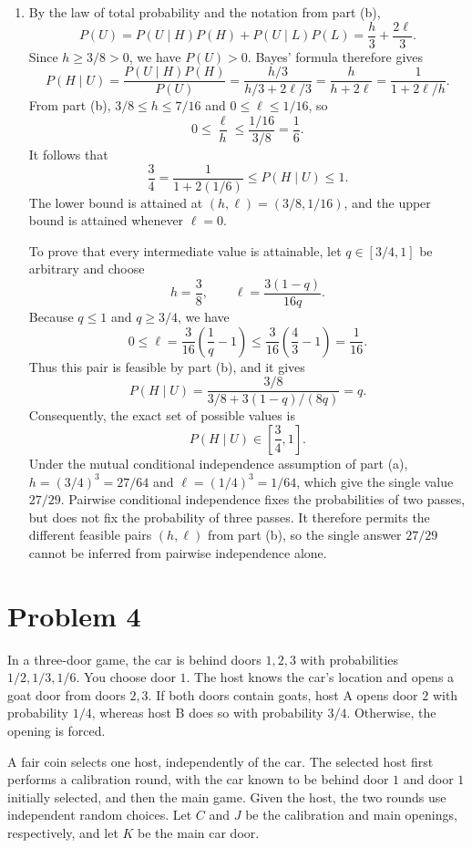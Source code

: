 \documentclass[11pt,a4paper]{article}
\newcommand{\Prob}{P}
\begin{document}
\begin{enumerate}
\item By the law of total probability and the notation from part (b),
\[
\Prob(U)=\Prob(U\mid H)\Prob(H)+\Prob(U\mid L)\Prob(L)
=\frac{h}{3}+\frac{2\ell}{3}.
\]
Since $h\ge3/8>0$, we have $\Prob(U)>0$. Bayes' formula therefore gives
\[
\Prob(H\mid U)
=\frac{\Prob(U\mid H)\Prob(H)}{\Prob(U)}
=\frac{h/3}{h/3+2\ell/3}
=\frac{h}{h+2\ell}
=\frac{1}{1+2\ell/h}.
\]
From part (b), $3/8\le h\le7/16$ and $0\le\ell\le1/16$, so
\[
0\le\frac{\ell}{h}\le\frac{1/16}{3/8}=\frac16.
\]
It follows that
\[
\frac34=\frac{1}{1+2(1/6)}
\le\Prob(H\mid U)\le1.
\]
The lower bound is attained at $(h,\ell)=(3/8,1/16)$, and the upper
bound is attained whenever $\ell=0$.

To prove that every intermediate value is attainable, let
$q\in[3/4,1]$ be arbitrary and choose
\[
h=\frac38,\qquad \ell=\frac{3(1-q)}{16q}.
\]
Because $q\le1$ and $q\ge3/4$, we have
\[
0\le\ell=\frac3{16}\left(\frac1q-1\right)
\le\frac3{16}\left(\frac43-1\right)=\frac1{16}.
\]
Thus this pair is feasible by part (b), and it gives
\[
\Prob(H\mid U)=\frac{3/8}{3/8+3(1-q)/(8q)}=q.
\]
Consequently, the exact set of possible values is
\[
\boxed{\Prob(H\mid U)\in\left[\frac34,1\right]}.
\]
Under the mutual conditional independence assumption of part (a),
$h=(3/4)^3=27/64$ and $\ell=(1/4)^3=1/64$, which give the single value
$27/29$. Pairwise conditional independence fixes the probabilities of
two passes, but does not fix the probability of three passes.
It therefore permits the different feasible pairs $(h,\ell)$ from
part (b), so the single answer $27/29$ cannot be inferred from pairwise
independence alone.
\end{enumerate}

\clearpage
\section*{Problem 4}
In a three-door game, the car is behind doors $1,2,3$ with probabilities
$1/2,1/3,1/6$. You choose door $1$. The host knows the car's location and
opens a goat door from doors $2,3$. If both doors contain goats, host A
opens door $2$ with probability $1/4$, whereas host B does so with
probability $3/4$. Otherwise, the opening is forced.

A fair coin selects one host, independently of the car. The selected host
first performs a calibration round, with the car known to be behind door
$1$ and door $1$ initially selected, and then the main game. Given the host, the two rounds use independent
random choices. Let $C$ and $J$ be the calibration and main openings,
respectively, and let $K$ be the main car door.
\end{document}
